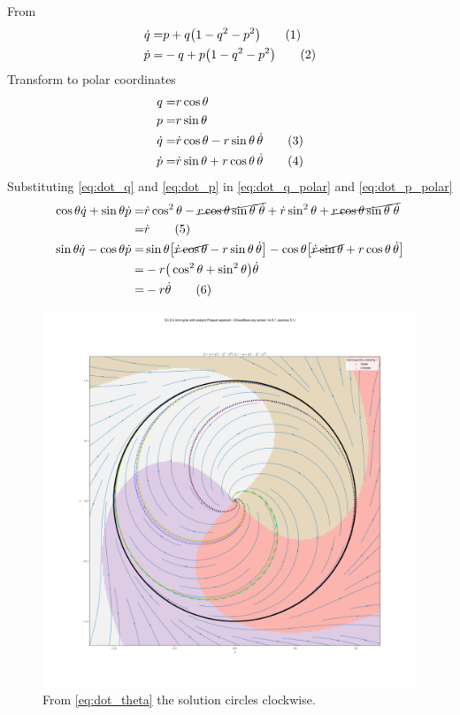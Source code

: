 \documentclass[]{article}
\newcommand\numberthis{\addtocounter{equation}{1}\tag{\theequation}}
\begin{document}
From \cite[Q1.3]{ChaosBook}
\begin{align*}
	\dot{q} =& p + q\big(1-q^2-p^2\big) \numberthis \label{eq:dot_q}\\
	\dot{p} =&-q + p\big(1-q^2-p^2\big) \numberthis \label{eq:dot_p}
\end{align*}
Transform to polar coordinates
\begin{align*}
	q =& r \cos{\theta}\\
	p =& r \sin{\theta}\\
	\dot{q} =& \dot{r} \cos{\theta}  - r \sin{\theta} \, \dot{\theta} \numberthis \label{eq:dot_q_polar}\\
	\dot{p} =& \dot{r} \sin{\theta}  + r \cos{\theta} \, \dot{\theta} \numberthis \label{eq:dot_p_polar}
\end{align*}
Substituting \eqref{eq:dot_q} and \eqref{eq:dot_p} in \eqref{eq:dot_q_polar} and \eqref{eq:dot_p_polar}
\begin{align*}
	\cos{\theta} \dot{q} + \sin{\theta} \dot{p} =& \dot{r}\cos^2\theta -\cancel{r \cos{\theta} \sin{\theta}\; \dot{\theta}} + \dot{r}\sin^2\theta+ \cancel{r \cos{\theta} \sin{\theta}\; \dot{\theta}}\\
	=& \dot{r}  \numberthis \label{eq:dot_r0}\\
	\sin{\theta} \dot{q} - \cos{\theta}\dot{p} =& \sin{\theta} \big[\cancel{\dot{r} \cos{\theta}}  - r \sin{\theta} \, \dot{\theta}\big] - \cos{\theta}\big[\cancel{\dot{r} \sin{\theta}}  + r \cos{\theta} \, \dot{\theta}\big]\\
	=& - r \big(\cos^2\theta+\sin^2\theta\big) \dot{\theta}\\
	=&-r \dot{\theta} \numberthis \label{eq:dot_theta}
\end{align*}
\begin{figure}[H]
	\caption{From \eqref{eq:dot_theta} the solution circles clockwise.}
	\includegraphics[width=\textwidth]{wk2/floquet.png}
\end{figure}
\end{document}
